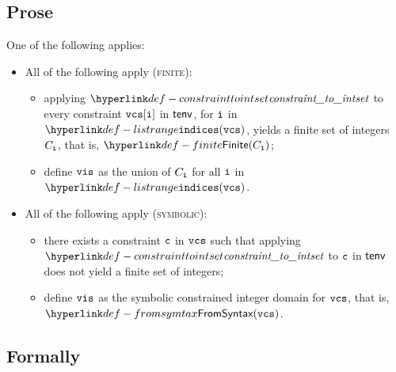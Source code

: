\subsection{Prose}
One of the following applies:
\begin{itemize}
  \item All of the following apply (\textsc{finite}):
  \begin{itemize}
    \item applying $\constrainttointset$ to every constraint $\vcs[\vi]$ in $\tenv$, for $\vi$ in \\ $\listrange(\vcs)$,
          yields a finite set of integers $C_\vi$, that is, $\Finite(C_\vi)$;
    \item define $\vis$ as the union of $C_\vi$ for all $\vi$ in $\listrange(\vcs)$.
  \end{itemize}

  \item All of the following apply (\textsc{symbolic}):
  \begin{itemize}
    \item there exists a constraint $\vc$ in $\vcs$ such that applying $\constrainttointset$ to $\vc$
          in $\tenv$ does not yield a finite set of integers;
    \item define $\vis$ as the symbolic constrained integer domain for $\vcs$, that is, \\
          $\FromSyntax(\vcs)$.
  \end{itemize}
\end{itemize}

\subsection{Formally}
\begin{mathpar}
\end{mathpar}

\begin{mathpar}
\end{mathpar}

